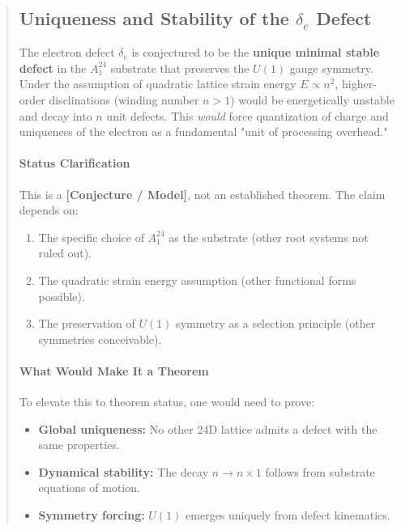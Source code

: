 \documentclass[11pt,titlepage]{article}
\begin{document}
\begin{abstract}

\subsection{Uniqueness and Stability of the $\delta_e$ Defect}
\begin{tcolorbox}[colback=yellow!5!white,colframe=yellow!75!black,title=Conjecture (Electron as Minimal Stable Defect)]
\label{conj:electron-minimal-defect}
The electron defect $\delta_e$ is conjectured to be the \textbf{unique minimal stable defect} in the $A_1^{24}$ substrate that preserves the $U(1)$ gauge symmetry. Under the assumption of quadratic lattice strain energy $E \propto n^2$, higher-order disclinations (winding number $n > 1$) would be energetically unstable and decay into $n$ unit defects. This \emph{would} force quantization of charge and uniqueness of the electron as a fundamental "unit of processing overhead."
\end{tcolorbox}

\paragraph{Status Clarification}
This is a \textbf{[Conjecture / Model]}, not an established theorem. The claim depends on:
\begin{enumerate}
\item The specific choice of $A_1^{24}$ as the substrate (other root systems not ruled out).
\item The quadratic strain energy assumption (other functional forms possible).
\item The preservation of $U(1)$ symmetry as a selection principle (other symmetries conceivable).
\end{enumerate}

\paragraph{What Would Make It a Theorem}
To elevate this to theorem status, one would need to prove:
\begin{itemize}
\item \textbf{Global uniqueness:} No other 24D lattice admits a defect with the same properties.
\item \textbf{Dynamical stability:} The decay $n \to n \times 1$ follows from substrate equations of motion.
\item \textbf{Symmetry forcing:} $U(1)$ emerges uniquely from defect kinematics.
\end{itemize}


\end{abstract}
\end{document}

